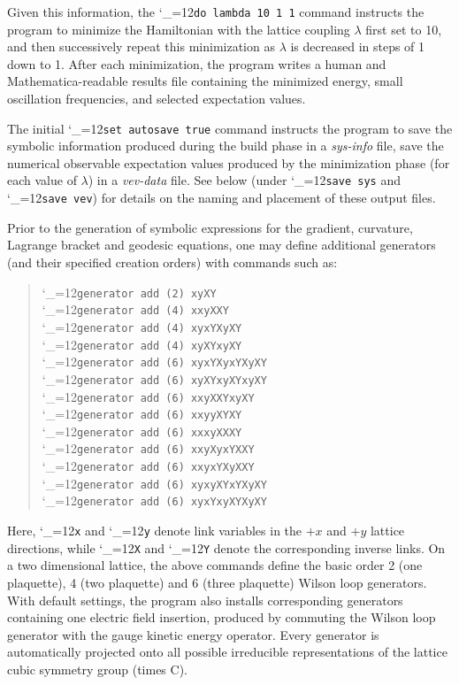 \documentclass [12pt]{article}
\makeatletter
\renewcommand{\tt}{\begingroup\catcode`_=12\def\_{\string_}\tt@}
\newcommand{\tt@}[1]{\texttt{#1}\endgroup}
\makeatother
\begin{document}
Given this information, the \tt{do lambda 10 1 1} command instructs
the program to minimize the Hamiltonian with the lattice
coupling $\lambda$ first set to 10, and then successively repeat
this minimization as $\lambda$ is decreased in steps of 1 down to 1.
After each minimization, the program writes a
human and Mathematica-readable results file
containing the minimized energy, small oscillation frequencies, and selected
expectation values.

The initial \tt{set autosave true} command instructs the program to
save the symbolic information produced during the build phase in
a \textit{sys-info} file, save the numerical observable expectation
values produced by the minimization phase (for each value of $\lambda$)
in a \textit{vev-data} file.
See below (under \tt{save sys} and \tt{save vev}) for details on the
naming and placement of these output files.

Prior to the generation of symbolic expressions for the gradient, curvature,
Lagrange bracket and geodesic equations, one may define additional
generators (and their specified creation orders) with commands such as:
\begin{quote}
\tt{generator add (2) xyXY}
\\\tt{generator add (4) xxyXXY}
\\\tt{generator add (4) xyxYXyXY}
\\\tt{generator add (4) xyXYxyXY}
\\\tt{generator add (6) xyxYXyxYXyXY}
\\\tt{generator add (6) xyXYxyXYxyXY}
\\\tt{generator add (6) xxyXXYxyXY}
\\\tt{generator add (6) xxyyXYXY}
\\\tt{generator add (6) xxxyXXXY}
\\\tt{generator add (6) xxyXyxYXXY}
\\\tt{generator add (6) xxyxYXyXXY}
\\\tt{generator add (6) xyxyXYxYXyXY}
\\\tt{generator add (6) xyxYxyXYXyXY}
\end{quote}
Here, \tt{x} and \tt{y} denote link variables in the $+x$ and $+y$
lattice directions, while \tt{X} and \tt{Y} denote the corresponding
inverse links.
On a two dimensional lattice, the above commands define
the basic order 2 (one plaquette), 4 (two plaquette) and 6 (three plaquette)
Wilson loop generators.
With default settings, the program also installs corresponding generators 
containing one electric field insertion, produced by commuting the Wilson loop
generator with the gauge kinetic energy operator.
Every generator is automatically projected onto all possible
irreducible representations of the lattice cubic symmetry group (times C).
\end{document}
